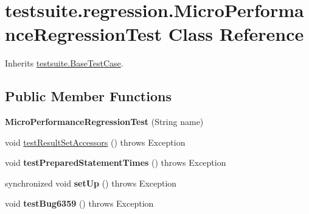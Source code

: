 \hypertarget{classtestsuite_1_1regression_1_1_micro_performance_regression_test}{}\section{testsuite.\+regression.\+Micro\+Performance\+Regression\+Test Class Reference}
\label{classtestsuite_1_1regression_1_1_micro_performance_regression_test}


Inherits \mbox{\hyperlink{classtestsuite_1_1_base_test_case}{testsuite.\+Base\+Test\+Case}}.

\subsection*{Public Member Functions}
\begin{DoxyCompactItemize}
\item 
\mbox{\label{classtestsuite_1_1regression_1_1_micro_performance_regression_test_a2b35cb55f972980421a850026caf1982}} 
{\bfseries Micro\+Performance\+Regression\+Test} (String name)
\item 
void \mbox{\hyperlink{classtestsuite_1_1regression_1_1_micro_performance_regression_test_a1fa02a07cb865e21f5debd2b6cf58782}{test\+Result\+Set\+Accessors}} ()  throws Exception 
\item 
\mbox{\label{classtestsuite_1_1regression_1_1_micro_performance_regression_test_a075ad2c74ac9703c0b94555dcf77cfb7}} 
void {\bfseries test\+Prepared\+Statement\+Times} ()  throws Exception 
\item 
\mbox{\label{classtestsuite_1_1regression_1_1_micro_performance_regression_test_a020f1b11692f8a0a7e260e6f2b9978c0}} 
synchronized void {\bfseries set\+Up} ()  throws Exception 
\item 
\mbox{\label{classtestsuite_1_1regression_1_1_micro_performance_regression_test_ae9d82e480f78e01505f493317298cd14}} 
void {\bfseries test\+Bug6359} ()  throws Exception 
\end{DoxyCompactItemize}
